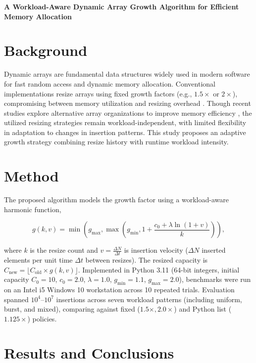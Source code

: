 \documentclass[11pt]{article}
\begin{document}
\begin{center}

{\Large\bfseries
A Workload-Aware Dynamic Array Growth Algorithm for Efficient Memory Allocation
}

\end{center}

\section*{Background}

Dynamic arrays are fundamental data structures widely used in modern software
for fast \mbox{random} access and dynamic memory allocation. Conventional
implementations resize arrays using fixed growth factors (e.g., $1.5\times$
or $2\times$), compromising between memory utilization and \mbox{resizing} \mbox{overhead}
\cite{brodnik}. Though recent studies explore alternative array organizations
to \mbox{improve} \mbox{memory} \mbox{efficiency} \cite{sartor,hoogerwoord}, the utilized resizing
strategies remain workload-independent, with \mbox{limited} \mbox{flexibility} in adaptation
to changes in insertion patterns. This study proposes an \mbox{adaptive} growth
strategy combining resize history with runtime workload intensity.

\section*{Method}

The proposed algorithm models the growth factor using a workload-aware
harmonic function,

\[
g(k,v)=
\min\left(
g_{\max},
\max\left(
g_{\min},
1+\frac{c_0+\lambda\ln(1+v)}{k}
\right)
\right),
\]

\noindent where $k$ is the resize count and $v = \frac{\Delta N}{\Delta t}$ is
insertion velocity ($\Delta N$ inserted elements per unit time $\Delta t$
between resizes). The resized capacity is $C_{\mathrm{new}} = \lfloor
C_{\mathrm{old}} \times g(k,v) \rfloor$. Implemented in Python 3.11 (64-bit
integers, initial capacity $C_0=10$, $c_0=2.0$, $\lambda=1.0$, $g_{\min}=1.1$,
$g_{\max}=2.0$), benchmarks were run on an Intel i5 Windows 10 workstation
across 10 repeated trials. Evaluation spanned $10^4$--$10^7$ insertions across
seven workload patterns (including uniform, burst, and mixed), comparing
against fixed ($1.5\times, 2.0\times$) and Python list ($1.125\times$)
policies.

\section*{Results and Conclusions}
\end{document}
